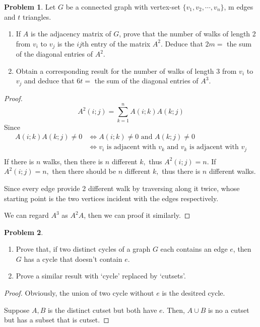 \documentclass[a4paper,11pt]{article}%
\theoremstyle{remark}
\theoremstyle{definition}
\newtheorem{problem}{Problem}[subsection]
\begin{document}
\begin{problem}
    Let $G$ be a connected graph with vertex-set $\{v_1,v_2,\cdots,v_n\}$,
    m edges and $t$ triangles. 
    \begin{enumerate}
        \item If $A$ is the adjacency matrix of $G$, prove that the number 
        of walks of length 2 from $v_i$ to $v_j$ is the $ij$th entry of the 
        matrix $A^2$. Deduce that $2m=$ the sum of the diagonal entries of $A^2$.
        \item Obtain a corresponding result for the number of walks of length $3$ 
        from $v_i$ to $v_j$ and deduce that $6t=$ the sum of the diagonal entries of $A^3$. 
    \end{enumerate}
    \begin{proof}
        \[A^2(i;j)=\sum_{k=1}^{n}A(i;k)A(k;j)\]
        Since
        \[
        \begin{array}{rl}
            A(i;k)A(k;j)\neq 0&\Leftrightarrow A(i;k)\neq 0 \text{ and }A(k;j)\neq 0\\
            &\Leftrightarrow v_i \text{ is adjacent with }v_k \text{ and }v_k \text{ is adjacent with }v_j\\ 
        \end{array}
    \]
    If there is $n$ walks, then there is $n$ different $k,$ thus $A^2(i;j)=n$.
    If $A^2(i;j)=n,$ then there should be $n$ different $k,$ thus there is $n$ different walks.

    Since every edge provide 2 different walk by traversing along it twice,
    whose starting point is the two vertices incident with the edges respectively.

    We can regard $A^3$ as $A^2 A$, then we can proof it similarly.
    \end{proof}
\end{problem}
\begin{problem}
    \begin{enumerate}
    \item Prove that, if two distinct cycles of a graph $G$ each contains an edge $e$,
    then $G$ has a cycle that doesn't contain $e$.
    \item Prove a similar result with `cycle' replaced by `cutsets'.
    \end{enumerate}
    \begin{proof}
        Obviously, the union of two cycle without $e$ is the desitred cycle.

        Suppose $A,B$ is the distinct cutset but both have $e$.
        Then, $A\cup B$ is no a cutset but has a subset that is cutset.
    \end{proof}
\end{problem}
\end{document}
